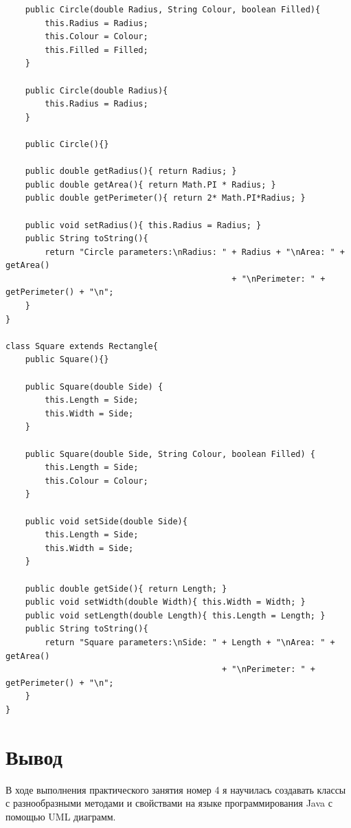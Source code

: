 \documentclass{article}
\begin{document}
\begin{verbatim}
    public Circle(double Radius, String Colour, boolean Filled){
        this.Radius = Radius;
        this.Colour = Colour;
        this.Filled = Filled;
    }

    public Circle(double Radius){
        this.Radius = Radius;
    }

    public Circle(){}

    public double getRadius(){ return Radius; }
    public double getArea(){ return Math.PI * Radius; }
    public double getPerimeter(){ return 2* Math.PI*Radius; }

    public void setRadius(){ this.Radius = Radius; }
    public String toString(){
        return "Circle parameters:\nRadius: " + Radius + "\nArea: " + getArea() 
                                              + "\nPerimeter: " + getPerimeter() + "\n";
    }
}

class Square extends Rectangle{
    public Square(){}

    public Square(double Side) {
        this.Length = Side;
        this.Width = Side;
    }

    public Square(double Side, String Colour, boolean Filled) {
        this.Length = Side;
        this.Colour = Colour;
    }

    public void setSide(double Side){
        this.Length = Side;
        this.Width = Side;
    }

    public double getSide(){ return Length; }
    public void setWidth(double Width){ this.Width = Width; }
    public void setLength(double Length){ this.Length = Length; }
    public String toString(){
        return "Square parameters:\nSide: " + Length + "\nArea: " + getArea() 
                                            + "\nPerimeter: " + getPerimeter() + "\n";
    }
}
\end{verbatim}

\section{Вывод}
В ходе выполнения практического занятия номер 4 я научилась создавать классы с разнообразными методами и свойствами на языке программирования Java с помощью UML диаграмм.
\end{document}
